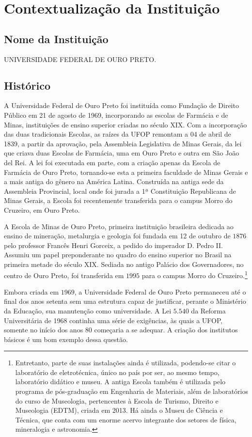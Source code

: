 \documentclass[
	12pt,				%
	openright,			%
	oneside,			%
	a4paper,			%
	english,			%
	brazil				%
	]{abntex2}
\begin{document}
\chapter{Contextualização da Instituição}
%
\section{Nome da Instituição}
UNIVERSIDADE FEDERAL DE OURO PRETO.
%
\section{Histórico}\label{sec:contextualizacao}
A Universidade Federal de Ouro Preto foi instituída como Fundação de Direito Público em 21 de agosto de 1969, incorporando as escolas de Farmácia e de Minas, instituições de ensino superior criadas no século XIX. Com a incorporação das duas tradicionais Escolas, as raízes da UFOP remontam a 04 de abril de 1839, a partir da aprovação, pela Assembleia Legislativa de Minas Gerais, da lei que criava duas Escolas de Farmácia, uma em Ouro Preto e outra em São João del Rei. A lei foi executada em parte, com a criação apenas da Escola de Farmácia de Ouro Preto, tornando-se esta a primeira faculdade de Minas Gerais e a mais antiga do gênero na América Latina. Construída na antiga sede da Assembleia Provincial, local onde foi jurada a 1ª Constituição Republicana de Minas Gerais, a Escola foi recentemente transferida para o campus Morro do Cruzeiro, em Ouro Preto.

A Escola de Minas de Ouro Preto, primeira instituição brasileira dedicada ao ensino de mineração, metalurgia e geologia foi fundada em 12 de outubro de $1876$ pelo professor Francês Henri Gorceix, a pedido do imperador D. Pedro II. Assumiu um papel preponderante no quadro do ensino superior no Brasil na primeira metade do século XIX. Sediada no antigo Palácio dos Governadores, no centro de Ouro Preto, foi transferida em $1995$ para o campus Morro do Cruzeiro.\footnote{Entretanto, parte de suas instalações ainda é utilizada, podendo-se citar o laboratório de eletrotécnica, único no país por ser, ao mesmo tempo, laboratório didático e museu. A antiga Escola também é utilizada pelo programa de pós-graduação em Engenharia de Materiais, além de laboratórios do curso de Museologia, pertencentes à Escola de Turismo, Direito e Museologia (EDTM), criada em 2013. Há ainda o Museu de Ciência e Técnica, que conta com um enorme acervo integrante dos setores de física, mineralogia e astronomia.}

Embora criada em $1969$, a Universidade Federal de Ouro Preto permaneceu até o final dos anos setenta sem uma estrutura capaz de justificar, perante o Ministério da Educação, sua manutenção como universidade. A Lei $5.540$ da Reforma Universitária de 1968 continha uma série de exigências, às quais a UFOP, somente no início dos anos $80$ começaria a se adequar. A criação dos institutos básicos é um bom exemplo dessa questão.
\end{document}
